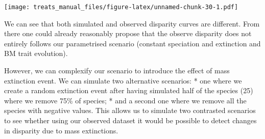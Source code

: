 \documentclass[
]{book}
\newenvironment{Shaded}{\begin{snugshade}}{\end{snugshade}}
\newcommand{\CommentTok}[1]{\textcolor[rgb]{0.56,0.35,0.01}{\textit{#1}}}
\newcommand{\DataTypeTok}[1]{\textcolor[rgb]{0.13,0.29,0.53}{#1}}
\newcommand{\DecValTok}[1]{\textcolor[rgb]{0.00,0.00,0.81}{#1}}
\newcommand{\FloatTok}[1]{\textcolor[rgb]{0.00,0.00,0.81}{#1}}
\newcommand{\KeywordTok}[1]{\textcolor[rgb]{0.13,0.29,0.53}{\textbf{#1}}}
\newcommand{\NormalTok}[1]{#1}
\newcommand{\OperatorTok}[1]{\textcolor[rgb]{0.81,0.36,0.00}{\textbf{#1}}}
\newcommand{\OtherTok}[1]{\textcolor[rgb]{0.56,0.35,0.01}{#1}}
\newcommand{\StringTok}[1]{\textcolor[rgb]{0.31,0.60,0.02}{#1}}
\begin{document}
\begin{Shaded}
\end{Shaded}

\texttt{[image: treats\_manual\_files/figure-latex/unnamed-chunk-30-1.pdf]}

We can see that both simulated and observed disparity curves are different.
From there one could already reasonably propose that the observe disparity does not entirely follows our parametrised scenario (constant speciation and extinction and BM trait evolution).

However, we can complexify our scenario to introduce the effect of mass extinction event.
We can simulate two alternative scenarios:
* one where we create a random extinction event after having simulated half of the species (25) where we remove 75\% of species;
* and a second one where we remove all the species with negative values.
This allows us to simulate two contrasted scenarios to see whether using our observed dataset it would be possible to detect changes in disparity due to mass extinctions.
\end{document}
